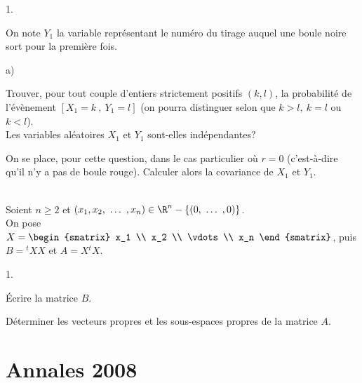 \documentclass[11pt]{article}%
\begin{document}
\begin{exerciceAP}
\begin{noliste}{1.}
  \item On note $Y_1$ la variable représentant le numéro du tirage
    auquel une boule noire sort pour la première fois.
    \begin{noliste}{a)}
    \setlength{\itemsep}{2mm}
    \item Trouver, pour tout couple d'entiers strictement positifs
      $(k,l)$, la probabilité de l'évènement $[ X_1 = k\ ,\ Y_1 = l]$
      (on pourra distinguer selon que $k > l,\ k=l$ ou $k < l$). \\
      Les variables aléatoires $X_1$ et $Y_1$ sont-elles
      indépendantes?
    \item On se place, pour cette question, dans le cas particulier où
      $r=0$ (c'est-à-dire qu'il n'y a pas de boule rouge). Calculer
      alors la covariance de $X_1$ et $Y_1$.
    \end{noliste} 
  \end{noliste}
\end{exerciceAP}


\begin{exerciceSP}~\\
  Soient $n \geq 2$ et $(x_1 , x_2,\ \dots\ , x_n) \in \R^n - \{(0,\
  \dots\ ,0) \}$. \\
  On pose $X = 
  \begin{smatrix} 
    x_1 \\
    x_2 \\ 
    \vdots \\
    x_n
  \end{smatrix}$, puis $B = {}^tX X$ et $A = X {}^t X$.
  \begin{noliste}{1.}
    \setlength{\itemsep}{2mm}
  \item Écrire la matrice $B$.
  \item Déterminer les vecteurs propres et les sous-espaces propres de
    la matrice $A$.
  \end{noliste}
\end{exerciceSP}


\newpage


\section{Annales 2008}
\end{document}
